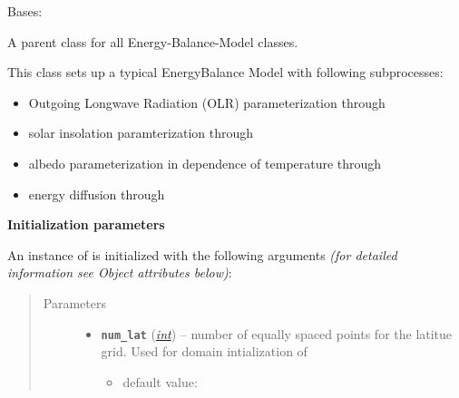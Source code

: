 \documentclass[letterpaper,10pt,english]{sphinxmanual}
\begin{document}
\begin{fulllineitems}
\label{api/climlab.model:climlab.model.ebm.EBM}
Bases: {\hyperref[api/climlab.process:climlab.process.energy_budget.EnergyBudget]{\emph{}}}

A parent class for all Energy-Balance-Model classes.

This class sets up a typical EnergyBalance Model with following subprocesses:
\begin{itemize}
\item {} 
Outgoing Longwave Radiation (OLR) parameterization through 
{\hyperref[api/climlab.radiation:climlab.radiation.AplusBT.AplusBT]{\emph{}}}

\item {} 
solar insolation paramterization through 
{\hyperref[api/climlab.radiation:climlab.radiation.insolation.P2Insolation]{\emph{}}}

\item {} 
albedo parameterization in dependence of temperature through
{\hyperref[api/climlab.surface:climlab.surface.albedo.StepFunctionAlbedo]{\emph{}}}

\item {} 
energy diffusion through 
{\hyperref[api/climlab.dynamics:climlab.dynamics.diffusion.MeridionalDiffusion]{\emph{}}}

\end{itemize}

\textbf{Initialization parameters}

An instance of  is initialized with the following 
arguments \emph{(for detailed information see Object attributes below)}:
\begin{quote}\begin{description}
\item[{Parameters}] \leavevmode\begin{itemize}
\item {} 
\textbf{\texttt{num\_lat}} (\href{http://docs.python.org/2.7/library/functions.html\#int}{\emph{int}}) -- 
number of equally spaced points for the 
latitue grid. Used for domain intialization of
{\hyperref[api/climlab.domain:climlab.domain.domain.zonal_mean_surface]{\emph{}}}
\begin{itemize}
\item {} 
default value: 


\end{itemize}
\end{itemize}
\end{description}
\end{quote}
\end{fulllineitems}
\end{document}
